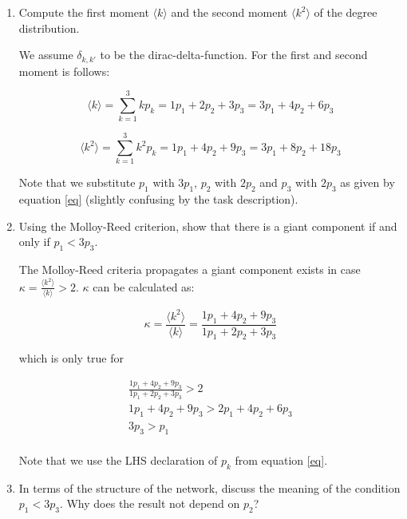 \begin{enumerate}
	\item Compute the first moment $\langle k \rangle$ and the second moment $\langle k^2 \rangle$ of the degree distribution.
	
	We assume $\delta_{k,k'}$ to be the dirac-delta-function. For the first and second moment is follows:
	
	\begin{equation*}
		\langle k \rangle = \sum_{k = 1}^3 k p_k = 1p_1 + 2p_2 + 3p_3 = 3p_1 + 4p_2 + 6p_3
	\end{equation*}

	\begin{equation*}
		\langle k^2 \rangle = \sum_{k = 1}^3 k^2 p_k = 1p_1 + 4p_2 + 9p_3 = 3p_1 + 8p_2 + 18p_3
	\end{equation*}
	
	Note that we substitute $p_1$ with $3p_1$, $p_2$ with $2p_2$ and $p_3$ with $2p_3$ as given by equation \ref{eq} (slightly confusing by the task description).
	
	\item Using the Molloy-Reed criterion, show that there is a giant component if and only if $p_1 < 3p_3$.
	
	The Molloy-Reed criteria propagates a giant component exists in case $\kappa = \frac{\langle k^2 \rangle}{\langle k \rangle} > 2$. $\kappa$ can be calculated as:
	
	\begin{equation*}
		\kappa = \frac{\langle k^2 \rangle}{\langle k \rangle} = \frac{1p_1 + 4p_2 + 9p_3}{1p_1 + 2p_2 + 3p_3}
	\end{equation*}

	which is only true for 
	
	\begin{equation*}
		\begin{split}
			\frac{1p_1 + 4p_2 + 9p_3}{1p_1 + 2p_2 + 3p_3} > 2 \\
			1p_1 + 4p_2 + 9p_3 > 2p_1 + 4p_2 + 6p_3 \\
			3p_3 > p_1 \\
		\end{split}
	\end{equation*}

	Note that we use the LHS declaration of $p_k$ from equation \ref{eq}.
	
	\item In terms of the structure of the network, discuss the meaning of the condition $p_1 < 3p_3$. Why does the result not depend on $p_2$?
	

\end{enumerate}
